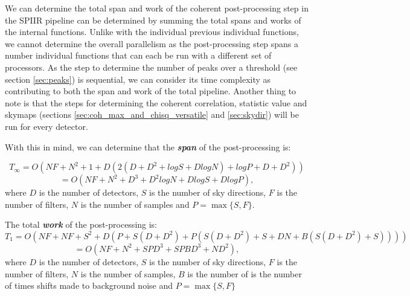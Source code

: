 \documentclass{article}
\begin{document}
We can determine the total span and work of the coherent post-processing step in the SPIIR pipeline can be determined by summing the total spans and works of the internal functions.
Unlike with the individual previous individual functions, we cannot determine the overall parallelism as the post-processing step spans a number individual functions that can each be run with a different set of processors.
As the step to determine the number of peaks over a threshold (see section \ref{sec:peaks}) is sequential, we can consider its time complexity as contributing to both the span and work of the total pipeline.
Another thing to note is that the steps for determining the coherent correlation, statistic value and skymaps (sections \ref{sec:coh_max_and_chisq_versatile} and \ref{sec:skydir}) will be run for every detector.

With this in mind, we can determine that the \textit{\textbf{span}} of the post-processing is:

\[
    T_\infty = O(NF + N^2 + 1 + D(2(D + D^2 + log S + D log N) + log P + D + D^2))
\]
\[
    = O(NF + N^2 + D^3 + D^2 log N + D log S + D log P),
\]
where \(D\) is the number of detectors, \(S\) is the number of sky directions, \(F\) is the number of filters, \(N\) is the number of samples and \(P = \max\{ S, F \}\).

The total \textit{\textbf{work}} of the post-processing is:
\[
    T_1 = O(NF + NF + S^2 + D(P + S(D + D^2) + P(S(D + D^2) + S + DN + B(S(D + D^2) + S))))
\]
\[
    = O(NF + N^2 + SPD^3 + SPBD^3 + ND^2),
\]
where \(D\) is the number of detectors, \(S\) is the number of sky directions, \(F\) is the number of filters, \(N\) is the number of samples, \(B\) is the number of is the number of times shifts made to background noise and \(P = \max\{ S, F \}\)

\printbibliography[
    heading=bibintoc,
    title={Bibliography}
]{}
\end{document}
